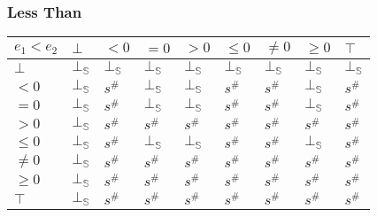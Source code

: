 \documentclass[aspectratio=169]{beamer}
\begin{document}
        \begin{frame}
            \frametitle{Less Than}
        \begin{table}
            \begin{tabular}{|l|l|l|l|l|l|l|l|l|}
            \hline
            $e_1 < e_2$ & $\bot$ & $<0$   & $=0$   & $>0$   & $\le 0$ & $\ne 0$ & $\ge 0$ & $\top$ \\ \hline
            $\bot$      & $\bot_\mathbb{S}$ & $\bot_\mathbb{S}$ & $\bot_\mathbb{S}$ & $\bot_\mathbb{S}$ & $\bot_\mathbb{S}$  & $\bot_\mathbb{S}$  & $\bot_\mathbb{S}$  & $\bot_\mathbb{S}$ \\ \hline
            $<0$        & $\bot_\mathbb{S}$ & $s^\#$ & $\bot_\mathbb{S}$ & $\bot_\mathbb{S}$ & $s^\#$  & $s^\#$  & $\bot_\mathbb{S}$  & $s^\#$ \\ \hline
            $=0$        & $\bot_\mathbb{S}$ & $s^\#$ & $\bot_\mathbb{S}$ & $\bot_\mathbb{S}$ & $s^\#$  & $s^\#$  & $\bot_\mathbb{S}$  & $s^\#$ \\ \hline
            $>0$        & $\bot_\mathbb{S}$ & $s^\#$ & $s^\#$ & $s^\#$ & $s^\#$  & $s^\#$  & $s^\#$  & $s^\#$ \\ \hline
            $\le 0$     & $\bot_\mathbb{S}$ & $s^\#$ & $\bot_\mathbb{S}$ & $\bot_\mathbb{S}$ & $s^\#$  & $s^\#$  & $\bot_\mathbb{S}$  & $s^\#$ \\ \hline
            $\ne 0$     & $\bot_\mathbb{S}$ & $s^\#$ & $s^\#$ & $s^\#$ & $s^\#$  & $s^\#$  & $s^\#$  & $s^\#$ \\ \hline
            $\ge 0$     & $\bot_\mathbb{S}$ & $s^\#$ & $s^\#$ & $s^\#$ & $s^\#$  & $s^\#$  & $s^\#$  & $s^\#$ \\ \hline
            $\top$      & $\bot_\mathbb{S}$ & $s^\#$ & $s^\#$ & $s^\#$ & $s^\#$  & $s^\#$  & $s^\#$  & $s^\#$ \\ \hline
            \end{tabular}
            \end{table}
        \end{frame}
\end{document}
